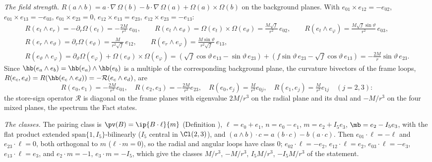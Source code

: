 \emph{The field strength.} $R(a \wedge b) = a\cdot\nabla\,\Omega(b) - b\cdot\nabla\,\Omega(a) + \Omega(a)\times\Omega(b)$ on the background planes. With $e_{01}\times e_{12} = -e_{02}$, $e_{01}\times e_{13} = -e_{03}$, $e_{01}\times e_{23} = 0$, $e_{12}\times e_{13} = e_{23}$, $e_{12}\times e_{23} = -e_{13}$:
\begin{gather*}
R(e_t\wedge e_r) = -\partial_r\Omega(e_t) = -\tfrac{2M}{r^{3}}\,e_{01}, \qquad
R(e_t\wedge e_\vartheta) = \Omega(e_t)\times\Omega(e_\vartheta) = \tfrac{M\sqrt f}{r^{2}}\,e_{02}, \qquad
R(e_t\wedge e_\varphi) = \tfrac{M\sqrt f\sin\vartheta}{r^{2}}\,e_{03}, \\
R(e_r\wedge e_\vartheta) = \partial_r\Omega(e_\vartheta) = \tfrac{M}{r^{2}\sqrt f}\,e_{12}, \qquad
R(e_r\wedge e_\varphi) = \tfrac{M\sin\vartheta}{r^{2}\sqrt f}\,e_{13}, \\
R(e_\vartheta\wedge e_\varphi) = \partial_\vartheta\Omega(e_\varphi) + \Omega(e_\vartheta)\times\Omega(e_\varphi) = (\sqrt f\cos\vartheta\,e_{13} - \sin\vartheta\,e_{23}) + (f\sin\vartheta\,e_{23} - \sqrt f\cos\vartheta\,e_{13}) = -\tfrac{2M}{r}\sin\vartheta\,e_{23}.
\end{gather*}
Since $\hb(e_a \wedge e_b) = \hb(e_a)\wedge\hb(e_b)$ is a multiple of the corresponding background plane, the curvature bivectors of the frame loops, $R(e_c, e_d) = R(\hb(e_c \wedge e_d)) = -\mathcal{R}(e_c \wedge e_d)$, are
\[
R(e_0, e_1) = -\tfrac{2M}{r^{3}}e_{01}, \quad R(e_2, e_3) = -\tfrac{2M}{r^{3}}e_{23}, \quad R(e_0, e_j) = \tfrac{M}{r^{3}}e_{0j}, \quad R(e_1, e_j) = \tfrac{M}{r^{3}}e_{1j} \quad (j = 2, 3):
\]
the store-sign operator $\mathcal{R}$ is diagonal on the frame planes with eigenvalue $2M/r^{3}$ on the radial plane and its dual and $-M/r^{3}$ on the four mixed planes, the spectrum the Fact states.

\emph{The classes.} The pairing class is $\pv(B) = \ip{B\cdot\ell}{m}$ (Definition ), $\ell = e_0 + e_1$, $n = e_0 - e_1$, $m = e_2 + I_5e_3$, $\mb = e_2 - I_5e_3$, with the flat product extended $\mathrm{span}\{1, I_5\}$-bilinearly ($I_5$ central in $\Cl(2,3)$), and $(a \wedge b)\cdot c = a\,(b\cdot c) - b\,(a\cdot c)$. Then $e_{01}\cdot\ell = -\ell$ and $e_{23}\cdot\ell = 0$, both orthogonal to $m$ ($\ell\cdot m = 0$), so the radial and angular loops have class $0$; $e_{02}\cdot\ell = -e_2$, $e_{12}\cdot\ell = e_2$, $e_{03}\cdot\ell = -e_3$, $e_{13}\cdot\ell = e_3$, and $e_2\cdot m = -1$, $e_3\cdot m = -I_5$, which give the classes $M/r^{3}$, $-M/r^{3}$, $I_5M/r^{3}$, $-I_5M/r^{3}$ of the statement.

